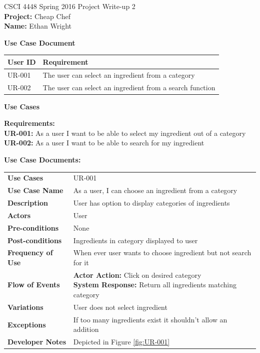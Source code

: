 \documentclass[12pt]{article}
\begin{document}
CSCI 4448 Spring 2016 \hfill Project Write-up 2\\
\textbf{Project: } Cheap Chef \\
\textbf{Name: } Ethan Wright \\


\hrulefill
\begin{center}
  \textbf{Use Case Document}
  \begin{tabular}{l  l}
    \textbf{User ID} & \textbf{Requirement} \\ \hline \rowcolor[gray]{.95}
    UR-001 & The user can select an ingredient from a category \\
    UR-002 & The user can select an ingredient from a search function \\ 
  \end{tabular}
\end{center}
\newpage
\begin{center}
  \textbf{Use Cases}
\end{center}
\textbf{Requirements: } \\
\textbf{UR-001: } As a user I want to be able to select my ingredient out of a category \\
\textbf{UR-002: } As a user I want to be able to search for my ingredient \\ 
\vspace{1cm}

\textbf{Use Case Documents:} \\
  \begin{tabular}{ l | l }
    \hline
    \textbf{Use Cases} & UR-001 \\ \rowcolor[gray]{.95}
    \textbf{Use Case Name} & As a user, I can choose an ingredient from a category \\ 
    \textbf{Description} & User has option to display categories of ingredients \\ \rowcolor[gray]{.95}
    \textbf{Actors} & User \\
    \textbf{Pre-conditions} & None \\ \rowcolor[gray]{.95}
    \textbf{Post-conditions} & Ingredients in category displayed to user \\ 
    \textbf{Frequency of Use} & When ever user wants to choose ingredient but not search for it \\ \rowcolor[gray]{.95}
    \textbf{Flow of Events} & \pbox{20cm}{\textbf{Actor Action: } Click on desired category\\ \textbf{System Response:} Return
    all ingredients matching category} \\ 
    \textbf{Variations} & User does not select ingredient \\  \rowcolor[gray]{.95}
    \textbf{Exceptions} & If too many ingredients exist it shouldn't allow an addition \\
    \textbf{Developer Notes} & Depicted in Figure \ref{fig:UR-001} \\ \hline
  \end{tabular}
\end{document}
